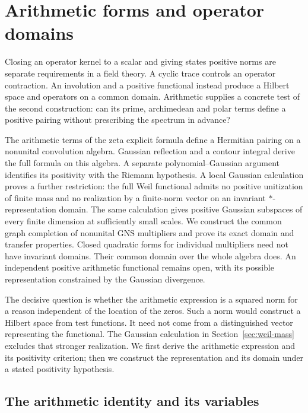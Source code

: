 \chapter{Arithmetic forms and operator domains}
\label{chap:weil-operator-domains}
\begingroup
{}
\newcommand{\A}{\mathcal A}

Closing an operator kernel to a scalar and giving states positive norms
are separate requirements in a field theory.
A cyclic trace controls an operator contraction.  An involution and a
positive functional instead produce a Hilbert space and operators on a
common domain.  Arithmetic supplies a concrete test of the second
construction: can its prime, archimedean and polar terms define a positive
pairing without prescribing the spectrum in advance?

The arithmetic terms of the zeta explicit formula define a Hermitian
pairing on a nonunital convolution algebra.  Gaussian reflection and a
contour integral derive the full formula on this algebra.  A separate
polynomial--Gaussian argument identifies its positivity with the Riemann
hypothesis.  A local Gaussian calculation proves a further
restriction: the full Weil functional admits no positive unitization of
finite mass and no realization by a finite-norm vector on an invariant
$*$-representation domain.  The same calculation gives positive Gaussian
subspaces of every finite dimension at sufficiently small scales.
We construct the common graph completion of
nonunital GNS multipliers and prove its exact domain and transfer
properties.  Closed quadratic forms for individual multipliers need not
have invariant domains.  Their common domain over the whole algebra does.
An independent positive arithmetic functional remains open, with its
possible representation constrained by the Gaussian divergence.


The decisive question is whether the arithmetic expression is a squared
norm for a reason independent of the location of the zeros.
Such a norm would construct a Hilbert space from test functions.
It need not come from a distinguished vector representing the functional.
The Gaussian calculation in Section~\ref{sec:weil-mass} excludes that
stronger realization.  We first derive the arithmetic expression and its
positivity criterion; then we construct the representation and its domain
under a stated positivity hypothesis.

\section{The arithmetic identity and its variables}

